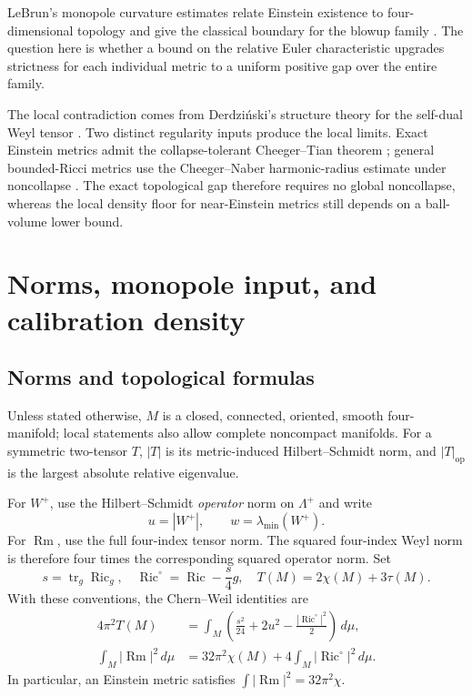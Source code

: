 \documentclass[a4paper,11pt]{article}
\theoremstyle{paper}
\DeclareMathOperator{\Ric}{Ric}
\DeclareMathOperator{\Rm}{Rm}
\DeclareMathOperator{\tr}{tr}
\newcommand{\op}{\mathrm{op}}
\newcommand{\dd}{\,d\mu}
\numberwithin{equation}{section}
\begin{document}
LeBrun's monopole curvature estimates relate Einstein existence to four-dimensional topology and give the classical boundary for the blowup family \cite{lebrun2001,lebrun2004}. The question here is whether a bound on the relative Euler characteristic upgrades strictness for each individual metric to a uniform positive gap over the entire family.

The local contradiction comes from Derdzi\'nski's structure theory for the self-dual Weyl tensor \cite{derd}. Two distinct regularity inputs produce the local limits. Exact Einstein metrics admit the collapse-tolerant Cheeger--Tian theorem \cite{ct,gejiang}; general bounded-Ricci metrics use the Cheeger--Naber harmonic-radius estimate under noncollapse \cite{cn}. The exact topological gap therefore requires no global noncollapse, whereas the local density floor for near-Einstein metrics still depends on a ball-volume lower bound.

\section{Norms, monopole input, and calibration density}

\subsection{Norms and topological formulas}

Unless stated otherwise, $M$ is a closed, connected, oriented, smooth four-manifold; local statements also allow complete noncompact manifolds. For a symmetric two-tensor $T$, $|T|$ is its metric-induced Hilbert--Schmidt norm, and $|T|_{\op}$ is the largest absolute relative eigenvalue.

For $W^+$, use the Hilbert--Schmidt \emph{operator} norm on $\Lambda^+$ and write
\[
u=|W^+|,\qquad w=\lambda_{\min}(W^+).
\]
For $\Rm$, use the full four-index tensor norm. The squared four-index Weyl norm is therefore four times the corresponding squared operator norm. Set
\[
s=\tr_g\Ric_g,\quad \Ric^\circ=\Ric-\frac{s}{4}g,\quad
T(M)=2\chi(M)+3\tau(M).
\]
With these conventions, the Chern--Weil identities are
\begin{align}
4\pi^2T(M)&=\int_M\left(\frac{s^2}{24}+2u^2-\frac{|\Ric^\circ|^2}{2}\right)\dd,\label{eq:cw}\\
\int_M|\Rm|^2\dd&=32\pi^2\chi(M)+4\int_M|\Ric^\circ|^2\dd.\label{eq:fullrm}
\end{align}
In particular, an Einstein metric satisfies $\int|\Rm|^2=32\pi^2\chi$.
\end{document}
